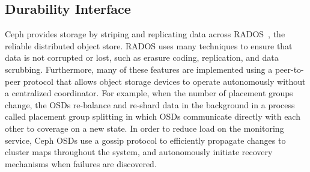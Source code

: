 \documentclass[preprint]{sigplanconf-eurosys}
\begin{document}




\subsection{Durability Interface}
\label{sec:durability}

Ceph provides storage by striping and replicating data across
RADOS~\cite{weil_rados_2007}, the reliable distributed object store. RADOS
uses many techniques to ensure that data is not corrupted or lost, such as
erasure coding, replication, and data scrubbing.
Furthermore, many of these features are implemented using a peer-to-peer
protocol that allows object storage devices to operate autonomously without
a centralized coordinator.
For example, when the number of placement groups change, the OSDs re-balance and
re-shard data in the background in a process called placement group splitting
in which OSDs communicate directly with each other to coverage on a new state.
In order to reduce load on the monitoring service, Ceph OSDs use a gossip
protocol to efficiently propagate changes to cluster maps throughout the
system, and autonomously initiate recovery mechanisms when failures are
discovered.
\end{document}
